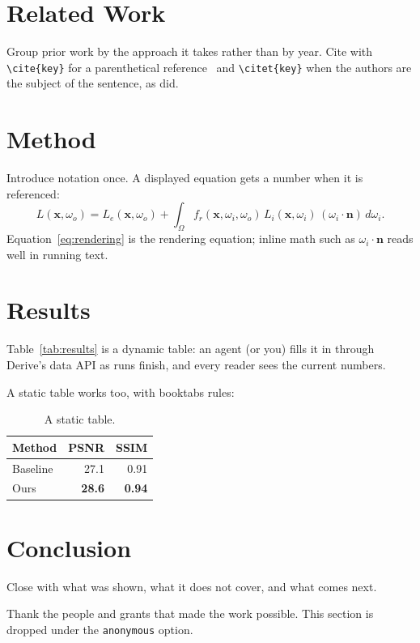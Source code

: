 \documentclass[sigconf]{acmart}
\begin{document}
\section{Related Work}

Group prior work by the approach it takes rather than by year. Cite with
\verb|\cite{key}| for a parenthetical reference~\cite{example2023survey} and
\verb|\citet{key}| when the authors are the subject of the sentence, as
\citet{example2020method} did.

\section{Method}
\label{sec:method}

Introduce notation once. A displayed equation gets a number when it is referenced:
\begin{equation}
  L(\mathbf{x}, \omega_o) = L_e(\mathbf{x}, \omega_o) + \int_{\Omega} f_r(\mathbf{x}, \omega_i, \omega_o)\, L_i(\mathbf{x}, \omega_i)\, (\omega_i \cdot \mathbf{n})\, d\omega_i .
  \label{eq:rendering}
\end{equation}
Equation~\eqref{eq:rendering} is the rendering equation; inline math such as
$\omega_i \cdot \mathbf{n}$ reads well in running text.

\section{Results}
\label{sec:results}

Table~\ref{tab:results} is a dynamic table: an agent (or you) fills it in through
Derive's data API as runs finish, and every reader sees the current numbers.

\begin{table}
  \caption{Quantitative comparison. Higher is better.}
  \label{tab:results}
\end{table}

A static table works too, with booktabs rules:

\begin{table}
  \caption{A static table.}
  \label{tab:static}
  \begin{tabular}{lrr}
    \toprule
    Method & PSNR & SSIM \\
    \midrule
    Baseline & 27.1 & 0.91 \\
    Ours & \textbf{28.6} & \textbf{0.94} \\
    \bottomrule
  \end{tabular}
\end{table}

\section{Conclusion}

Close with what was shown, what it does not cover, and what comes next.

\begin{acks}
Thank the people and grants that made the work possible. This section is dropped under
the \texttt{anonymous} option.
\end{acks}



\end{document}
